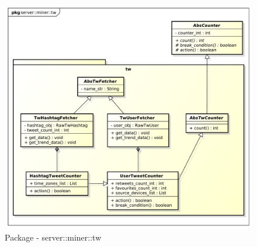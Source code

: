 	\begin{figure}[!htbp]
		\centering
		\centerline{\includegraphics[scale=0.4]{./images/server/miner_tw.pdf}}
		\caption{Package - server::miner::tw}
	\end{figure}

